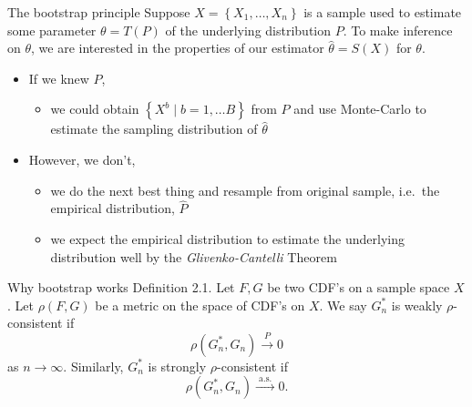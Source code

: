 \documentclass[
  ignorenonframetext,
]{beamer}
\providecommand{\tightlist}{%
  \setlength{\itemsep}{0pt}\setlength{\parskip}{0pt}}
\begin{document}
\begin{frame}{The bootstrap principle}
\protect{}\label{the-bootstrap-principle}
Suppose \(X=\left\{X_{1}, \ldots, X_{n}\right\}\) is a sample used to
estimate some parameter \(\theta=T(P)\) of the underlying distribution
\(P\). To make inference on \(\theta\), we are interested in the
properties of our estimator \(\hat{\theta}=S(X)\) for \(\theta\).

\pause

\begin{itemize}
\tightlist
\item
  If we knew \(P\),

  \begin{itemize}
  \tightlist
  \item
    we could obtain \(\left\{X^{b} \mid b=1, \ldots B\right\}\) from
    \(P\) and use Monte-Carlo to estimate the sampling distribution of
    \(\hat{\theta}\)
  \end{itemize}
\end{itemize}

\pause

\begin{itemize}
\tightlist
\item
  However, we don't,

  \begin{itemize}
  \tightlist
  \item
    we do the next best thing and resample from original sample,
    i.e.~the empirical distribution, \(\hat{P}\)
  \item
    we expect the empirical distribution to estimate the underlying
    distribution well by the \emph{Glivenko-Cantelli} Theorem
  \end{itemize}
\end{itemize}
\end{frame}

\begin{frame}{Why bootstrap works}
\protect{}\label{why-bootstrap-works}
Definition 2.1. Let \(F, G\) be two CDF's on a sample space \(X\). Let
\(\rho(F, G)\) be a metric on the space of CDF's on \(X\). We say
\(G_n^*\) is weakly \(\rho\)-consistent if \[
\rho\left(G_n^*, G_n\right) \stackrel{P}{\rightarrow} 0
\] as \(n \rightarrow \infty\). Similarly, \(G_n^*\) is strongly
\(\rho\)-consistent if \[
\rho\left(G_n^*, G_n\right) \stackrel{\text { a.s. }}{\longrightarrow} 0 .
\]
\end{frame}
\end{document}
